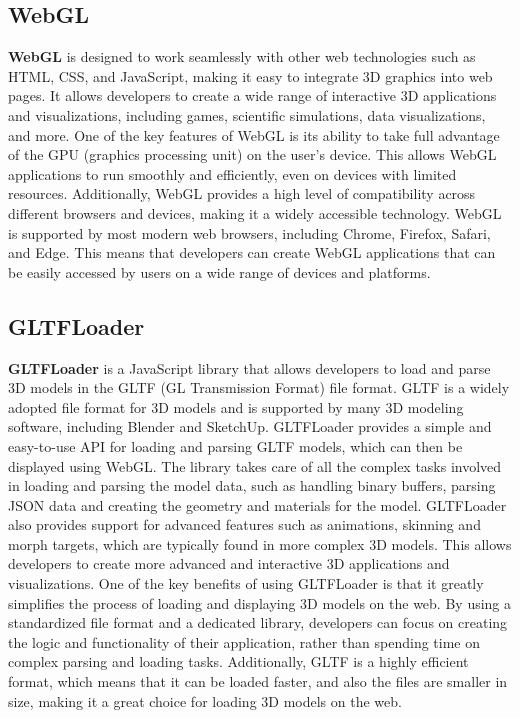 \subsection{WebGL}
\textbf{WebGL} is designed to work seamlessly with other web technologies such as HTML, CSS, and JavaScript, 
making it easy to integrate 3D graphics into web pages. It allows developers to create a wide range 
of interactive 3D applications and visualizations, including games, scientific 
simulations, data visualizations, and more.
One of the key features of WebGL is its ability to take full advantage of the GPU 
(graphics processing unit) on the user's device. This allows WebGL applications to 
run smoothly and efficiently, even on devices with limited resources. Additionally, WebGL provides 
a high level of compatibility across different browsers and devices, making it a widely accessible technology.
WebGL is supported by most modern web browsers, including Chrome, Firefox, Safari, and Edge. 
This means that developers can create WebGL applications that can be easily accessed by 
users on a wide range of devices and platforms. \cite{WebGL}

\subsection{GLTFLoader}
\textbf{GLTFLoader} is a JavaScript library that allows developers to load and parse 3D models in the GLTF 
(GL Transmission Format) file format. GLTF is a widely adopted file format for 3D models and is 
supported by many 3D modeling software, including Blender and SketchUp.
GLTFLoader provides a simple and easy-to-use API for loading and parsing GLTF models, 
which can then be displayed using WebGL. The library takes care of all the complex tasks 
involved in loading and parsing the model data, such as handling binary buffers, parsing 
JSON data and creating the geometry and materials for the model.
GLTFLoader also provides support for advanced features such as animations, skinning and morph 
targets, which are typically found in more complex 3D models. This allows developers to create 
more advanced and interactive 3D applications and visualizations.
One of the key benefits of using GLTFLoader is that it greatly simplifies the process of loading and 
displaying 3D models on the web. By using a standardized file format and a dedicated library, 
developers can focus on creating the logic and functionality of their application, rather than 
spending time on complex parsing and loading tasks.
Additionally, GLTF is a highly efficient format, which means that it can be loaded faster, 
and also the files are smaller in size, making it a great choice for loading 3D models on the web. \cite{GLTFLoader}

